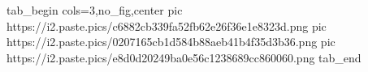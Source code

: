  
 
 
 
 
\zzSecCmtScr

\ifcmt
  tab_begin cols=3,no_fig,center
     pic https://i2.paste.pics/c6882cb339fa52fb62e26f36e1e8323d.png
		 pic https://i2.paste.pics/0207165cb1d584b88aeb41b4f35d3b36.png
		 pic https://i2.paste.pics/e8d0d20249ba0e56c1238689cc860060.png
  tab_end
\fi
